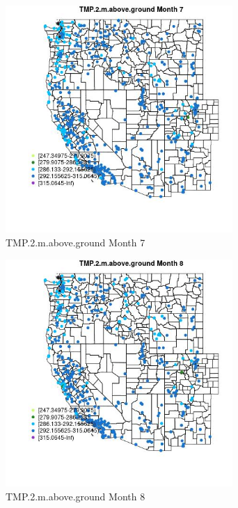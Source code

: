 \begin{figure} 
\centering  
\includegraphics[width=0.77\textwidth]{Code_Outputs/Report_ML_input_PM25_Step4_part_e_de_duplicated_aves_compiled_2019-05-14wNAs_MapObsMo7TMP2maboveground.jpg} 
\caption{\label{fig:Report_ML_input_PM25_Step4_part_e_de_duplicated_aves_compiled_2019-05-14wNAsMapObsMo7TMP2maboveground}TMP.2.m.above.ground Month 7} 
\end{figure} 
 

\begin{figure} 
\centering  
\includegraphics[width=0.77\textwidth]{Code_Outputs/Report_ML_input_PM25_Step4_part_e_de_duplicated_aves_compiled_2019-05-14wNAs_MapObsMo8TMP2maboveground.jpg} 
\caption{\label{fig:Report_ML_input_PM25_Step4_part_e_de_duplicated_aves_compiled_2019-05-14wNAsMapObsMo8TMP2maboveground}TMP.2.m.above.ground Month 8} 
\end{figure} 
 

